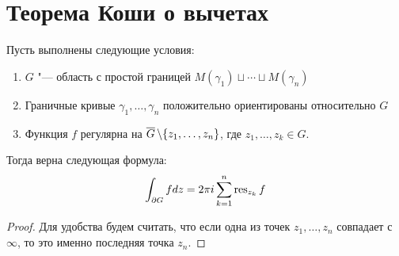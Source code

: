 \section{Теорема Коши о вычетах}

\begin{theorem}
	Пусть выполнены следующие условия:
	\begin{enumerate}
		\item $G$ "--- область с простой границей $M(\gamma_1) \sqcup \dotsb \sqcup M(\gamma_n)$
		
		\item Граничные кривые $\gamma_1, \dotsc, \gamma_n$ положительно ориентированы относительно $G$
		
		\item Функция $f$ регулярна на $\overline{G}\,\backslash \{z_1, \dotsc, z_n\}$, где $z_1, \dotsc, z_k \in G$.
	\end{enumerate}
	
	Тогда верна следующая формула:
	\[\int_{\partial G}fdz = 2\pi i\sum_{k = 1}^n\operatorname{res}_{z_k}f\]
\end{theorem}

\begin{proof}
	Для удобства будем считать, что если одна из точек $z_1, \dotsc, z_n$ совпадает с $\infty$, то это именно последняя точка $z_n$.
\end{proof}